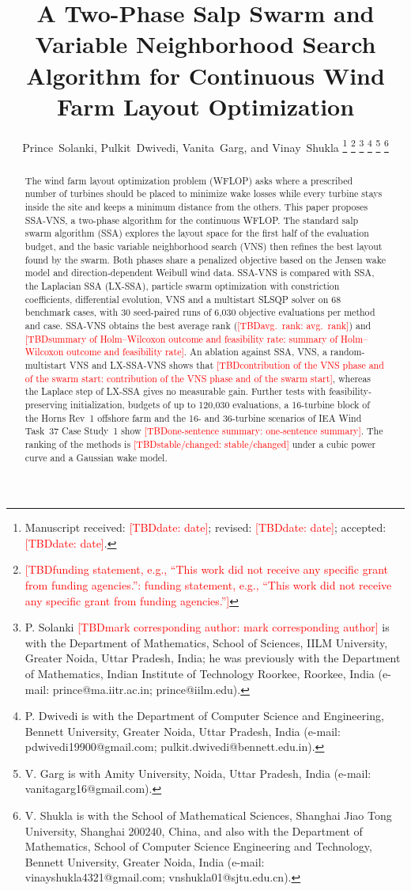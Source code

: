 \documentclass[journal,twoside]{IEEEtran}
\newcommand{\TBD}[1]{\textcolor{red}{[TBD\ifx\relax#1\relax\else: #1\fi]}}
\begin{document}
\title{A Two-Phase Salp Swarm and Variable Neighborhood Search Algorithm for Continuous Wind Farm Layout Optimization}
\author{Prince~Solanki, Pulkit~Dwivedi, Vanita~Garg, and Vinay~Shukla
\thanks{Manuscript received: \TBD{date}; revised: \TBD{date}; accepted: \TBD{date}.}
\thanks{\TBD{funding statement, e.g., ``This work did not receive any specific grant from funding agencies.''}}
\thanks{P. Solanki \TBD{mark corresponding author} is with the Department of Mathematics, School of Sciences, IILM University, Greater Noida, Uttar Pradesh, India; he was previously with the Department of Mathematics, Indian Institute of Technology Roorkee, Roorkee, India (e-mail: prince@ma.iitr.ac.in; prince@iilm.edu).}
\thanks{P. Dwivedi is with the Department of Computer Science and Engineering, Bennett University, Greater Noida, Uttar Pradesh, India (e-mail: pdwivedi19900@gmail.com; pulkit.dwivedi@bennett.edu.in).}
\thanks{V. Garg is with Amity University, Noida, Uttar Pradesh, India (e-mail: vanitagarg16@gmail.com).}
\thanks{V. Shukla is with the School of Mathematical Sciences, Shanghai Jiao Tong University, Shanghai 200240, China, and also with the Department of Mathematics, School of Computer Science Engineering and Technology, Bennett University, Greater Noida, India (e-mail: vinayshukla4321@gmail.com; vnshukla01@sjtu.edu.cn).}}

\maketitle

\begin{abstract}
The wind farm layout optimization problem (WFLOP) asks where a prescribed number of turbines should be placed to minimize wake losses while every turbine stays inside the site and keeps a minimum distance from the others. This paper proposes SSA-VNS, a two-phase algorithm for the continuous WFLOP. The standard salp swarm algorithm (SSA) explores the layout space for the first half of the evaluation budget, and the basic variable neighborhood search (VNS) then refines the best layout found by the swarm. Both phases share a penalized objective based on the Jensen wake model and direction-dependent Weibull wind data. SSA-VNS is compared with SSA, the Laplacian SSA (LX-SSA), particle swarm optimization with constriction coefficients, differential evolution, VNS and a multistart SLSQP solver on 68 benchmark cases, with 30 seed-paired runs of 6,030 objective evaluations per method and case. SSA-VNS obtains the best average rank (\TBD{avg.\ rank}) and \TBD{summary of Holm--Wilcoxon outcome and feasibility rate}. An ablation against SSA, VNS, a random-multistart VNS and LX-SSA-VNS shows that \TBD{contribution of the VNS phase and of the swarm start}, whereas the Laplace step of LX-SSA gives no measurable gain. Further tests with feasibility-preserving initialization, budgets of up to 120,030 evaluations, a 16-turbine block of the Horns Rev~1 offshore farm and the 16- and 36-turbine scenarios of IEA Wind Task~37 Case Study~1 show \TBD{one-sentence summary}. The ranking of the methods is \TBD{stable/changed} under a cubic power curve and a Gaussian wake model.
\end{abstract}
\end{document}
